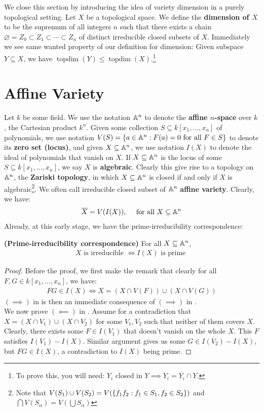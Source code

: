 \documentclass{report}
\begin{document}
We close this section by introducing the idea of variety dimension in a purely topological setting. Let $X$ be a topological space. We define the \textbf{dimension of $X$} to be the supremum of all integers $n$ such that there exists a chain $\varnothing =Z_0 \subset Z_1 \subset \cdots \subset Z_n$ of distinct irreducible closed subsets of $X$. Immediately we see same wanted property of our definition for dimension: Given subspace $Y\subseteq X$, we have $\operatorname{topdim}(Y)\leq \operatorname{topdim}(X)$.\footnote{To prove this, you will need: $Y_i$ closed in  $Y\implies Y_i=\overline{Y_i}\cap Y$.}
\section{Affine Variety}
Let $k$ be some field. We use the notation $\mathbb{A}^n$ to denote the \textbf{affine $n$-space} over $k$, the Cartesian product $k^n$. Given some collection $S \subseteq k[x_1,\dots ,x_n]$ of polynomials, we use notation $V(S)= \{ a \in \mathbb{A}^n:F(a)=0\text{ for all }F \in S \}$ to denote its \textbf{zero set (locus)}, and given $X \subseteq \mathbb{A}^n$, we use notation $I(X)$ to denote the ideal of polynomials that vanish on $X$. If $X \subseteq \mathbb{A}^n$ is the locus of some $S \subseteq k[x_1,\dots ,x_n]$, we say $X$ is \textbf{algebraic}. Clearly this give rise to a topology on $\mathbb{A}^n$, the  \textbf{Zariski topology}, in which $X\subseteq \mathbb{A}^n$ is closed if and only if $X$ is algebraic\footnote{Note that $V(S_1)\cup V(S_2)=V(\{ f_1f_2:f_1 \in S_1,f_2\in S_2 \})$ and $\bigcap V(S_\alpha )=V (\bigcup S_\alpha )$}. We often call irreducible closed subset of $\mathbb{A}^n$  \textbf{affine variety}. Clearly, we have: 
\begin{align}
\label{ovlX}
 \overline{X}=V(I(X)),\quad \text{ for all }X \subseteq \mathbb{A}^n
\end{align}
Already, at this early stage, we have the prime-irreducibility correspondence: 
\begin{theorem}
\label{Pic}
\textbf{(Prime-irreducibility correspondence)} For all  $X\subseteq \mathbb{A}^n$, 
\begin{align}
\label{XIX}
X\text{ is irreducible }\iff  I(X)\text{ is prime  }
\end{align}
\end{theorem}
\begin{proof}
Before the proof, we first make the remark that clearly for all $F,G \in k[x_1,\dots ,x_n]$, we have: 
\begin{align}
\label{FGI}
FG \in I(X)\iff  X= (X\cap V(F))\cup  (X\cap V(G))
\end{align}
$(\implies )$ in  is then an immediate consequence of $(\implies )$ in .  \\

We now prove $(\impliedby)$ in . Assume for a contradiction that $X=(X\cap V_1)\cup (X\cap V_2)$ for some $V_1,V_2$ such that neither of them covers $X$. Clearly, there exists some $F \in I(V_1)$ that doesn't vanish on the whole $X$. This $F$ satisfies $I(V_1)-I(X)$. Similar argument gives us some $G \in I(V_2)-I(X)$, but $FG \in I(X)$, a contradiction to $I(X)$ being prime. 
\end{proof}
\end{document}

